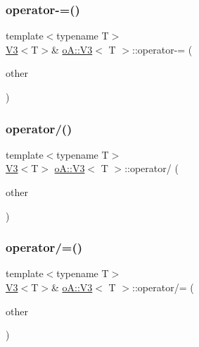 \mbox{\label{structo_a_1_1_v3_a631255b2f80594b99423a807e1846df2}} 
\subsubsection{\texorpdfstring{operator-\/=()}{operator-=()}}
{\footnotesize\ttfamily template$<$typename T$>$ \\
\mbox{\hyperlink{structo_a_1_1_v3}{V3}}$<$T$>$\& \mbox{\hyperlink{structo_a_1_1_v3}{o\+A\+::\+V3}}$<$ T $>$\+::operator-\/= (\begin{DoxyParamCaption}\item[{const \mbox{\hyperlink{structo_a_1_1_v3}{o\+A\+::\+V3}}$<$ T $>$ \&}]{other }\end{DoxyParamCaption})\hspace{0.3cm}{\ttfamily [inline]}}

\mbox{\label{structo_a_1_1_v3_a46bcba5d859f26e3ecffd4ceb7ca275f}} 
\subsubsection{\texorpdfstring{operator/()}{operator/()}}
{\footnotesize\ttfamily template$<$typename T$>$ \\
\mbox{\hyperlink{structo_a_1_1_v3}{V3}}$<$T$>$ \mbox{\hyperlink{structo_a_1_1_v3}{o\+A\+::\+V3}}$<$ T $>$\+::operator/ (\begin{DoxyParamCaption}\item[{const \mbox{\hyperlink{structo_a_1_1_v3}{o\+A\+::\+V3}}$<$ T $>$ \&}]{other }\end{DoxyParamCaption})\hspace{0.3cm}{\ttfamily [inline]}}

\mbox{\label{structo_a_1_1_v3_a6bd81647929ff9d4ba4aa992074317e2}} 
\subsubsection{\texorpdfstring{operator/=()}{operator/=()}}
{\footnotesize\ttfamily template$<$typename T$>$ \\
\mbox{\hyperlink{structo_a_1_1_v3}{V3}}$<$T$>$\& \mbox{\hyperlink{structo_a_1_1_v3}{o\+A\+::\+V3}}$<$ T $>$\+::operator/= (\begin{DoxyParamCaption}\item[{const \mbox{\hyperlink{structo_a_1_1_v3}{o\+A\+::\+V3}}$<$ T $>$ \&}]{other }\end{DoxyParamCaption})\hspace{0.3cm}{\ttfamily [inline]}}

